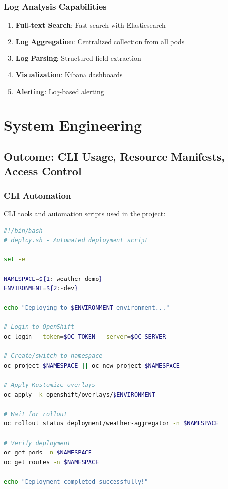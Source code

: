 \documentclass[12pt,a4paper]{article}
\begin{document}
\subsubsection{Log Analysis Capabilities}

\begin{enumerate}
    \item \textbf{Full-text Search}: Fast search with Elasticsearch
    \item \textbf{Log Aggregation}: Centralized collection from all pods
    \item \textbf{Log Parsing}: Structured field extraction
    \item \textbf{Visualization}: Kibana dashboards
    \item \textbf{Alerting}: Log-based alerting
\end{enumerate}

\section{System Engineering}

\subsection{Outcome: CLI Usage, Resource Manifests, Access Control}

\subsubsection{CLI Automation}

CLI tools and automation scripts used in the project:

\begin{lstlisting}[language=bash, caption=Deployment Script]
#!/bin/bash
# deploy.sh - Automated deployment script

set -e

NAMESPACE=${1:-weather-demo}
ENVIRONMENT=${2:-dev}

echo "Deploying to $ENVIRONMENT environment..."

# Login to OpenShift
oc login --token=$OC_TOKEN --server=$OC_SERVER

# Create/switch to namespace
oc project $NAMESPACE || oc new-project $NAMESPACE

# Apply Kustomize overlays
oc apply -k openshift/overlays/$ENVIRONMENT

# Wait for rollout
oc rollout status deployment/weather-aggregator -n $NAMESPACE

# Verify deployment
oc get pods -n $NAMESPACE
oc get routes -n $NAMESPACE

echo "Deployment completed successfully!"
\end{lstlisting}
\end{document}
